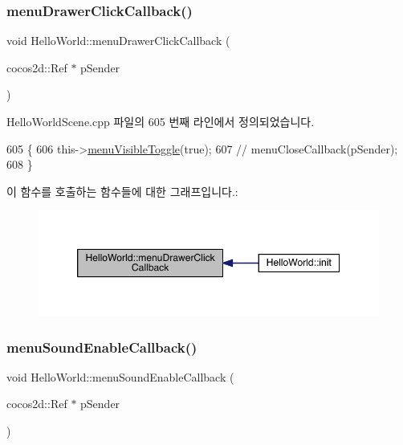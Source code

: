 \subsubsection{\texorpdfstring{menu\+Drawer\+Click\+Callback()}{menuDrawerClickCallback()}}
{\footnotesize\ttfamily void Hello\+World\+::menu\+Drawer\+Click\+Callback (\begin{DoxyParamCaption}\item[{cocos2d\+::\+Ref $\ast$}]{p\+Sender }\end{DoxyParamCaption})}



Hello\+World\+Scene.\+cpp 파일의 605 번째 라인에서 정의되었습니다.


\begin{DoxyCode}
605                                                     \{
606     this->\hyperlink{class_hello_world_a38047ef68d46872dd39be5d4cc59ad18}{menuVisibleToggle}(\textcolor{keyword}{true});
607    \textcolor{comment}{// menuCloseCallback(pSender);}
608 \}
\end{DoxyCode}
이 함수를 호출하는 함수들에 대한 그래프입니다.\+:
\nopagebreak
\begin{figure}[H]
\begin{center}
\leavevmode
\includegraphics[width=350pt]{d9/d98/class_hello_world_a1609fd202ff4b899571aeb34b3cdaed4_icgraph}
\end{center}
\end{figure}
\mbox{\label{class_hello_world_aa0aab5c2537449752853c2924db53261}} 
\subsubsection{\texorpdfstring{menu\+Sound\+Enable\+Callback()}{menuSoundEnableCallback()}}
{\footnotesize\ttfamily void Hello\+World\+::menu\+Sound\+Enable\+Callback (\begin{DoxyParamCaption}\item[{cocos2d\+::\+Ref $\ast$}]{p\+Sender }\end{DoxyParamCaption})}



